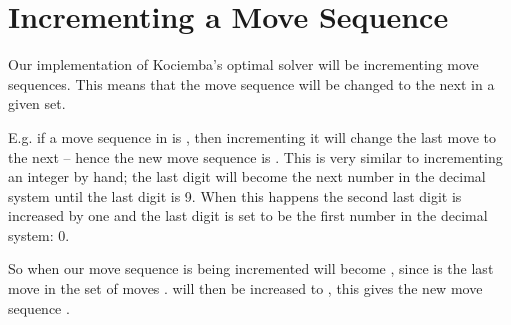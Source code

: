 \section{Incrementing a Move Sequence}
\label{sec:incMoveSequence}
Our implementation of Kociemba's optimal solver will be incrementing move sequences.
This means that the move sequence will be changed to the next in a given set.

E.g. if a move sequence in  is , then incrementing it will change the last move  to the next  -- hence the new move sequence is .
This is very similar to incrementing an integer by hand; the last digit will become the next number in the decimal system until the last digit is 9. When this happens the second last digit is increased by one and the last digit is set to be the first number in the decimal system: 0.

So when our move sequence  is being incremented  will become , since  is the last move in the set of moves .  will then be increased to , this gives the new move sequence .